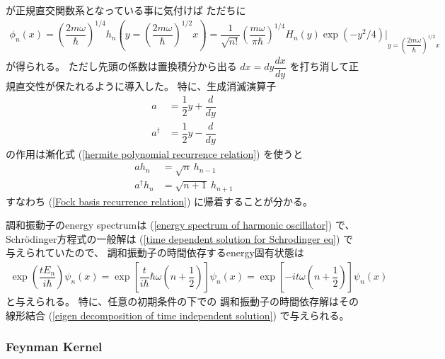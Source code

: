 が正規直交関数系となっている事に気付けば
ただちに
\begin{align}
    \phi_n(x)
    =
    \left(
            \dfrac{2 m \omega}{\hbar}
    \right)^{1/4}
    h_n
    \left(
        y =
        \left(
            \dfrac{2 m \omega}{\hbar}
        \right)^{1/2} x
    \right)
    =
    \dfrac{1}{ \sqrt{n!} }
    \left(
            \dfrac{m \omega}{\pi \hbar}
    \right)^{1/4}
    H_n(y) \exp(- y^2 / 4)
    \bigg|_{
        y =
        \left(
            \dfrac{2 m \omega}{\hbar}
        \right)^{1/2}
        x
    }
\end{align}
が得られる。
ただし先頭の係数は置換積分から出る
$dx = dy \dfrac{dx}{dy}$
を打ち消して正規直交性が保たれるように導入した。
特に、生成消滅演算子
\begin{subequations}
\begin{align}
    a
    &=
    \dfrac{1}{2}
    y
    +
    \dfrac{d}{dy}
\\
    a^\dagger
    &=
    \dfrac{1}{2}
    y
    -
    \dfrac{d}{dy}
\end{align}
\end{subequations}
の作用は漸化式
(\ref{hermite polynomial recurrence relation})
を使うと
\begin{align}
    a h_n &= \sqrt{n}\ h_{n-1}
\\
    a^\dagger h_n
    &= \sqrt{n + 1}\ h_{n+1}
\end{align}
すなわち
(\ref{Fock basis recurrence relation})
に帰着することが分かる。

調和振動子のenergy spectrumは
(\ref{energy spectrum of harmonic oscillator})
で、
Schr\"odinger方程式の一般解は
(\ref{time dependent solution for Schrodinger eq})
で与えられていたので、
調和振動子の時間依存するenergy固有状態は
\begin{align}
    \exp( \dfrac{t E_n}{i\hbar} )
    \psi_n (x)
    =
    \exp\left[
        \dfrac{t}{i\hbar}
        \hbar \omega
        \left( n + \dfrac{1}{2} \right)
    \right]
    \psi_n (x)
    =
    \exp\left[
        - i t \omega
        \left( n + \dfrac{1}{2} \right)
    \right]
    \psi_n (x)
\end{align}
と与えられる。
特に、任意の初期条件の下での
調和振動子の時間依存解はその線形結合
(\ref{eigen decomposition of time independent solution})
で与えられる。

\subsubsection{Feynman Kernel}

